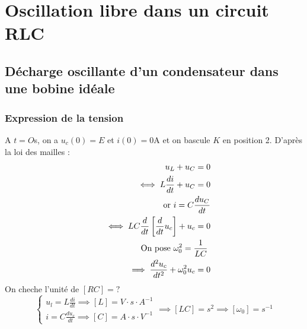 \chapter{Oscillation libre dans un circuit RLC}
\section{Décharge oscillante d'un condensateur dans une bobine idéale}
\subsection{Expression de la tension}
A \(t = O\)s, on a \(u_{c}(0) = E\) et \(i(0) = 0\)A et on bascule \(K\) en position 2. 
D'après la loi des mailles :\\
\begin{eqnarray*}
    &&u_{L} + u_{C} = 0\\
    &&\iff L \frac{di}{dt} + u_{C} = 0\\
    &&\text{or } i = C \frac{du_{C}}{dt} \\
    &&\iff LC \frac{d}{dt}\left[ \frac{d}{dt}u_{c} \right] + u_{c} = 0\\
    &&\textnormal{On pose \(\omega_{0}^{2} = \frac{1}{LC}\) }\\
    &&\implies \frac{d^{2}u_{c}}{dt^{2}} + \omega_{0}^{2} u_{c} = 0
\end{eqnarray*}
On cheche l'unité de \(\left[ RC \right] = ?\)\\
\[
    \begin{cases}
        u_{l} = L \frac{di}{dt} \implies [L] = V \cdot s \cdot A^{-1}\\
        i = C \frac{du_{c}}{dt} \implies \left[ C \right] = A \cdot  s \cdot  V^{-1}
    \end{cases}
    \implies \left[ LC \right] = s^{2} \implies \left[ \omega_{0} \right] = s^{-1}
\] 

